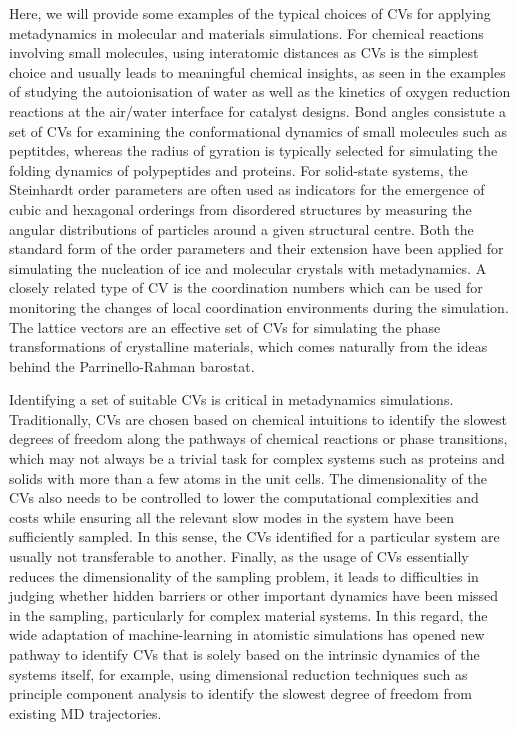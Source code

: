 Here, we will provide some examples of the typical choices of CVs for applying metadynamics in molecular and materials simulations.  For chemical reactions involving small molecules, using interatomic distances as CVs is the simplest choice and usually leads to meaningful chemical insights, as seen in the examples of studying the autoionisation of water \cite{liu2023mechanistic} as well as the kinetics of oxygen reduction reactions at the air/water interface for catalyst designs.\cite{yang2023neural} Bond angles consistute a set of CVs for examining the conformational dynamics of small molecules such as peptitdes,\cite{mccarty2017variational}  whereas the radius of gyration is typically selected for simulating the folding dynamics of polypeptides and proteins.\cite{vymetal2011gyration} For solid-state systems, the Steinhardt order parameters\cite{steinhardt1983bond} are often used as indicators for the emergence of cubic and hexagonal orderings from disordered structures by measuring the angular distributions of particles around a given structural centre. Both the standard form of the order parameters and their extension have been applied for simulating the nucleation of ice\cite{quigley2008metadynamics} and molecular crystals\cite{giberti2015metadynamics} with metadynamics.  A closely related type of CV is the coordination numbers\cite{iacovella2007efficient} which can be used for monitoring the changes of local coordination environments during the simulation. The lattice vectors\cite{martovnak2003predicting} are an effective set of CVs for simulating the phase transformations of crystalline materials, which comes naturally from the ideas behind the Parrinello-Rahman barostat.\cite{parrinello1980crystal} 

Identifying a set of suitable CVs is critical in metadynamics simulations. Traditionally, CVs are chosen based on chemical intuitions to identify the slowest degrees of freedom along the pathways of chemical reactions or phase transitions, which may not always be a trivial task for complex systems such as proteins and solids with more than a few atoms in the unit cells. The dimensionality of the CVs also needs to be controlled to lower the computational complexities and costs while ensuring all the relevant slow modes in the system have been sufficiently sampled. In this sense, the CVs identified for a particular system are usually not transferable to another. Finally, as the usage of CVs essentially reduces the dimensionality of the sampling problem, it leads to difficulties in judging whether hidden barriers or other important dynamics have been missed in the sampling, particularly for complex material systems. In this regard, the wide adaptation of machine-learning in atomistic simulations has opened new pathway to identify CVs that is solely based on the intrinsic dynamics of the systems itself, for example, using dimensional reduction techniques such as principle component analysis\cite{sittel2018perspective} to identify the slowest degree of freedom from existing MD trajectories. 
